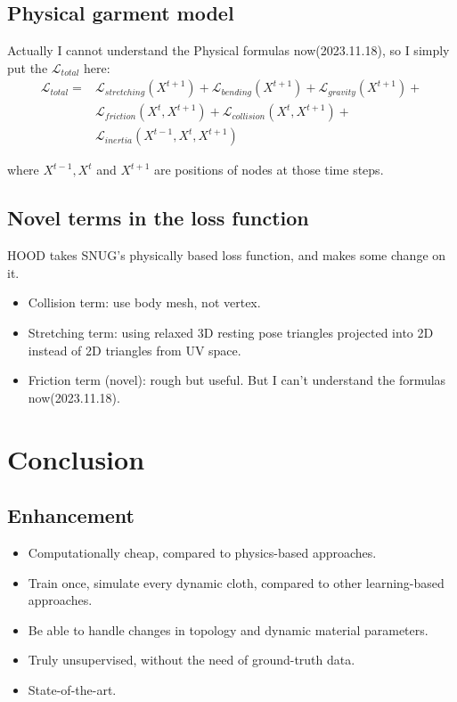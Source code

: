 \documentclass{article}
\begin{document}
\subsection{Physical garment model}
\par Actually I cannot understand the Physical formulas now(2023.11.18), so I simply put the $\mathcal{L}_{total}$ here:
\begin{align*}
    \mathcal{L}_{total} = & \mathcal{L}_{stretching}(X^{t+1}) + \mathcal{L}_{bending}(X^{t+1}) + \mathcal{L}_{gravity}(X^{t+1}) +\\ & \mathcal{L}_{friction}(X^t,X^{t+1}) + \mathcal{L}_{collision}(X^t,X^{t+1}) +\\ & \mathcal{L}_{inertia}(X^{t-1},X^t,X^{t+1})
\end{align*}
\par where $X^{t-1},X^t$ and $X^{t+1}$ are positions of nodes at those time steps.
\subsection{Novel terms in the loss function}
\par HOOD takes SNUG\cite{santesteban2022snug}'s physically based loss function, and makes some change on it.
\begin{itemize}
    \item Collision term: use body mesh, not vertex.
    \item Stretching term: using relaxed 3D resting pose triangles projected into 2D instead of 2D triangles from UV space.
    \item Friction term (novel): rough but useful. But I can't understand the formulas now(2023.11.18).
\end{itemize}
\section{Conclusion}
\subsection{Enhancement}
\begin{itemize}
    \item Computationally cheap, compared to physics-based approaches.
    \item Train once, simulate every dynamic cloth, compared to other learning-based approaches.
    \item Be able to handle changes in topology and dynamic material parameters.
    \item Truly unsupervised, without the need of ground-truth data.
    \item State-of-the-art.
\end{itemize}
\end{document}
